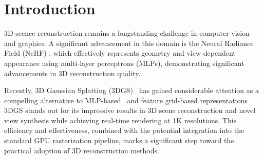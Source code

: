 \section{Introduction}


3D scence reconstruction remains a longstanding challenge in computer vision and graphics. A significant advancement in this domain is the Neural Radiance Field (NeRF) \cite{nerf}, which effectively represents geometry and view-dependent appearance using multi-layer perceptrons (MLPs), demonstrating significant advancements in 3D reconstruction quality.

Recently, 3D Gaussian Splatting (3DGS)~\cite{3dgs} has gained considerable attention as a compelling alternative to MLP-based~\cite{nerf} and feature grid-based representations~\cite{tensorf,plenoxels,Neural,Instant_neural}. 3DGS stands out for its impressive results in 3D scene reconstruction and novel view synthesis while achieving real-time rendering at 1K resolutions. 
This efficiency and effectiveness, combined with the potential integration into the standard GPU rasterization pipeline, marks a significant step toward the practical adoption of 3D reconstruction methods.


    



